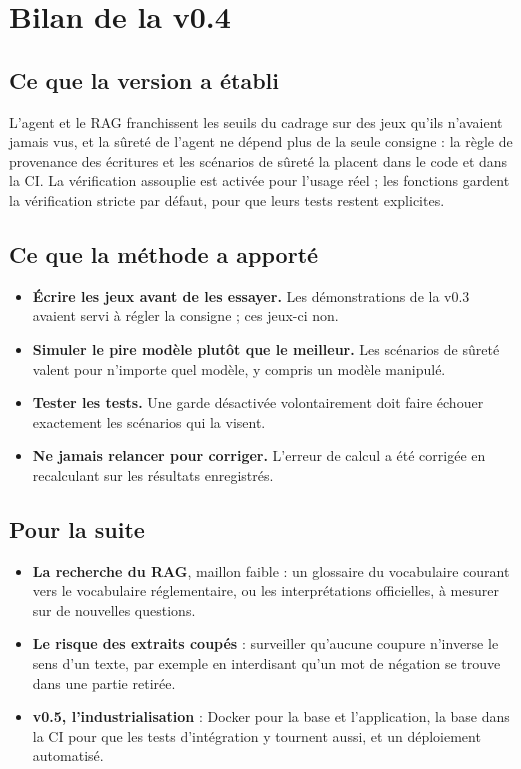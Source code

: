 \documentclass[11pt,a4paper]{article}
\begin{document}
\newpage
\section{Bilan de la v0.4}

\subsection{Ce que la version a établi}

L'agent et le RAG franchissent les seuils du cadrage sur des jeux qu'ils n'avaient jamais vus, et la sûreté de l'agent ne dépend plus de la seule consigne : la règle de provenance des écritures et les scénarios de sûreté la placent dans le code et dans la CI. La vérification assouplie est activée pour l'usage réel ; les fonctions gardent la vérification stricte par défaut, pour que leurs tests restent explicites.

\subsection{Ce que la méthode a apporté}

\begin{itemize}
  \item \textbf{Écrire les jeux avant de les essayer.} Les démonstrations de la v0.3 avaient servi à régler la consigne ; ces jeux-ci non.
  \item \textbf{Simuler le pire modèle plutôt que le meilleur.} Les scénarios de sûreté valent pour n'importe quel modèle, y compris un modèle manipulé.
  \item \textbf{Tester les tests.} Une garde désactivée volontairement doit faire échouer exactement les scénarios qui la visent.
  \item \textbf{Ne jamais relancer pour corriger.} L'erreur de calcul a été corrigée en recalculant sur les résultats enregistrés.
\end{itemize}

\subsection{Pour la suite}

\begin{itemize}
  \item \textbf{La recherche du RAG}, maillon faible : un glossaire du vocabulaire courant vers le vocabulaire réglementaire, ou les interprétations officielles, à mesurer sur de nouvelles questions.
  \item \textbf{Le risque des extraits coupés} : surveiller qu'aucune coupure n'inverse le sens d'un texte, par exemple en interdisant qu'un mot de négation se trouve dans une partie retirée.
  \item \textbf{v0.5, l'industrialisation} : Docker pour la base et l'application, la base dans la CI pour que les tests d'intégration y tournent aussi, et un déploiement automatisé.
\end{itemize}
\end{document}
